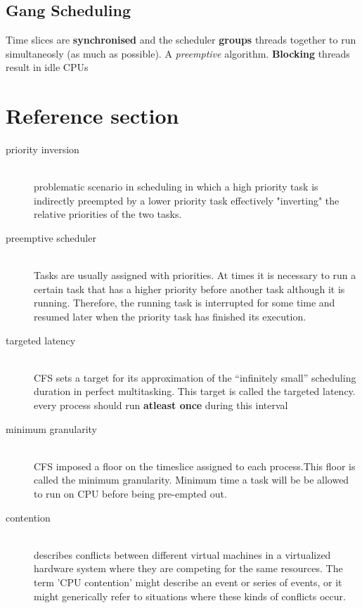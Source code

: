 \documentclass{article}
\begin{document}
\subsection{Gang Scheduling}
\begin{flushleft}
Time slices are \textbf{synchronised} and the scheduler \textbf{groups} threads together to run simultaneosly (as much as possible). A \textit{preemptive} algorithm. \textbf{Blocking} threads result in idle CPUs
\end{flushleft}

\pagebreak
\section*{Reference section} \label{sec:reference}
\begin{description}
	\item[priority inversion] \hfill \\ problematic scenario in scheduling in which a high priority task is indirectly preempted by a lower priority task effectively "inverting" the relative priorities of the two tasks.
	\item[preemptive scheduler] \hfill \\ Tasks are usually assigned with priorities. At times it is necessary to run a certain task that has a higher priority before another task although it is running. Therefore, the running task is interrupted for some time and resumed later when the priority task has finished its execution.
	\item[targeted latency] \hfill \\ CFS sets a target for its approximation of the “infinitely small” scheduling duration in perfect multitasking. This target is called the targeted latency. every process should run \textbf{atleast once} during this interval
	\item[minimum granularity] \hfill \\ CFS imposed a floor on the timeslice assigned to each process.This floor is called the minimum granularity. Minimum time a task will be be allowed to run on CPU before being pre-empted out.
	\item[contention] \hfill \\ describes conflicts between different virtual machines in a virtualized hardware system where they are competing for the same resources. The term 'CPU contention’ might describe an event or series of events, or it might generically refer to situations where these kinds of conflicts occur.
\end{description}
\end{document}
